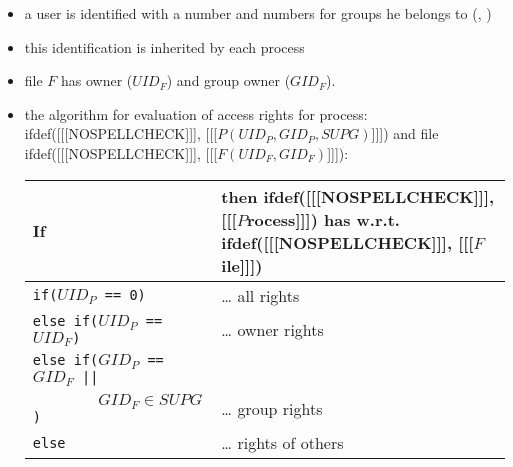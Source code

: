
\begin{slide}
\setlength{\baselineskip}{0.9\baselineskip}
\begin{itemize}
\item a user is identified with a  number and numbers for groups he
belongs to (, )
\item this identification is inherited by each process
\item file $F$ has owner ($UID_F$) and group owner ($GID_F$). 
\item the algorithm for evaluation of access rights for process:
ifdef([[[NOSPELLCHECK]]], [[[$P(UID_P,GID_P,SUPG)$]]]) and file
ifdef([[[NOSPELLCHECK]]], [[[$F(UID_F,GID_F)$]]]):
\begin{tabular}{ll}
If & then ifdef([[[NOSPELLCHECK]]], [[[$P$rocess]]]) has w.r.t.
ifdef([[[NOSPELLCHECK]]], [[[$F$ile]]]) \\ 
\hline
\texttt{if($UID_P$ == 0)} & \dots{} all rights \\
\texttt{else if($UID_P$ == $UID_F$)} & \dots{} owner rights \\
\texttt{else if($GID_P$ == $GID_F$ ||} &\\
\texttt{~~~~~~~~$GID_F \in SUPG$)} & \dots{} group rights \\
\texttt{else} & \dots{} rights of others
\end{tabular}
\end{itemize}
\end{slide}

